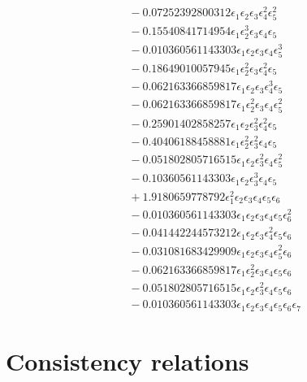 \documentclass[10pt]{article}
\begin{document}
\begin{align*}
&{}  - 0.07252392800312 \epsilon_{1} \epsilon_{2} \epsilon_{3} \epsilon_{4}^{2} \epsilon_{5}^{2} \\
&{}  - 0.15540841714954 \epsilon_{1} \epsilon_{2}^{3} \epsilon_{3} \epsilon_{4} \epsilon_{5} \\
&{}  - 0.010360561143303 \epsilon_{1} \epsilon_{2} \epsilon_{3} \epsilon_{4} \epsilon_{5}^{3} \\
&{}  - 0.18649010057945 \epsilon_{1} \epsilon_{2}^{2} \epsilon_{3} \epsilon_{4}^{2} \epsilon_{5} \\
&{}  - 0.062163366859817 \epsilon_{1} \epsilon_{2} \epsilon_{3} \epsilon_{4}^{3} \epsilon_{5} \\
&{}  - 0.062163366859817 \epsilon_{1} \epsilon_{2}^{2} \epsilon_{3} \epsilon_{4} \epsilon_{5}^{2} \\
&{}  - 0.25901402858257 \epsilon_{1} \epsilon_{2} \epsilon_{3}^{2} \epsilon_{4}^{2} \epsilon_{5} \\
&{}  - 0.40406188458881 \epsilon_{1} \epsilon_{2}^{2} \epsilon_{3}^{2} \epsilon_{4} \epsilon_{5} \\
&{}  - 0.051802805716515 \epsilon_{1} \epsilon_{2} \epsilon_{3}^{2} \epsilon_{4} \epsilon_{5}^{2} \\
&{}  - 0.10360561143303 \epsilon_{1} \epsilon_{2} \epsilon_{3}^{3} \epsilon_{4} \epsilon_{5} \\
&{}  + 1.9180659778792 \epsilon_{1}^{2} \epsilon_{2} \epsilon_{3} \epsilon_{4} \epsilon_{5} \epsilon_{6} \\
&{}  - 0.010360561143303 \epsilon_{1} \epsilon_{2} \epsilon_{3} \epsilon_{4} \epsilon_{5} \epsilon_{6}^{2} \\
&{}  - 0.041442244573212 \epsilon_{1} \epsilon_{2} \epsilon_{3} \epsilon_{4}^{2} \epsilon_{5} \epsilon_{6} \\
&{}  - 0.031081683429909 \epsilon_{1} \epsilon_{2} \epsilon_{3} \epsilon_{4} \epsilon_{5}^{2} \epsilon_{6} \\
&{}  - 0.062163366859817 \epsilon_{1} \epsilon_{2}^{2} \epsilon_{3} \epsilon_{4} \epsilon_{5} \epsilon_{6} \\
&{}  - 0.051802805716515 \epsilon_{1} \epsilon_{2} \epsilon_{3}^{2} \epsilon_{4} \epsilon_{5} \epsilon_{6} \\
&{}  - 0.010360561143303 \epsilon_{1} \epsilon_{2} \epsilon_{3} \epsilon_{4} \epsilon_{5} \epsilon_{6} \epsilon_{7}
\end{align*}

\section{Consistency relations}
\end{document}
